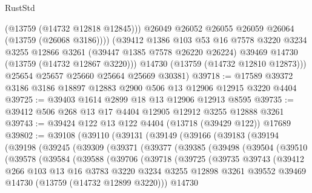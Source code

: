 \begin{lexlean}{RustStd}
\begin{coremodule}
              (@13759 (@14732 @12818 @12845)))
            @26049
            @26052
            @26055
            @26059
            @26064
            (@13759 (@26068 @3186))))
        (@39412
          @1386
          @103
          @53
          @16
          @7578
          @3220
          @3234
          @3255
          @12866
          @3261
          (@39447 @1385 @7578 @26220 @26224)
          @39469
          @14730
          (@13759 (@14732 @12867 @3220)))
        @14730
        (@13759 (@14732 @12810 @12873)))
      @25654
      @25657
      @25660
      @25664
      @25669
      @30381)
@39718 := @17589 @39372 @3186 @3186 @18897 @12883 @2900 @506 @13 @12906 @12915 @3220 @4404
@39725 := @39403 @1614 @2899 @18 @13 @12906 @12913 @8595
@39735 := @39412 @506 @268 @13 @17 @4404 @12905 @12912 @3255 @12888 @3261
@39743 := @39424 @122 @13 @122 @4404 (@13718 (@39429 @122)) @17689
@39802 := @39108
    (@39110
      (@39131
        (@39149
          (@39166
            (@39183
              (@39194
                (@39198
                  (@39245
                    (@39309
                      (@39371
                        (@39377
                          (@39385
                            (@39498
                              (@39504
                                (@39510
                                  (@39578
                                    (@39584
                                      (@39588
                                        (@39706
                                          (@39718
                                            (@39725
                                              (@39735
                                                @39743
                                                (@39412
                                                  @266
                                                  @103
                                                  @13
                                                  @16
                                                  @3783
                                                  @3220
                                                  @3234
                                                  @3255
                                                  @12898
                                                  @3261
                                                  @39552
                                                  @39469
                                                  @14730
                                                  (@13759 (@14732 @12899 @3220)))
                                                @14730

\end{coremodule}
\end{lexlean}
